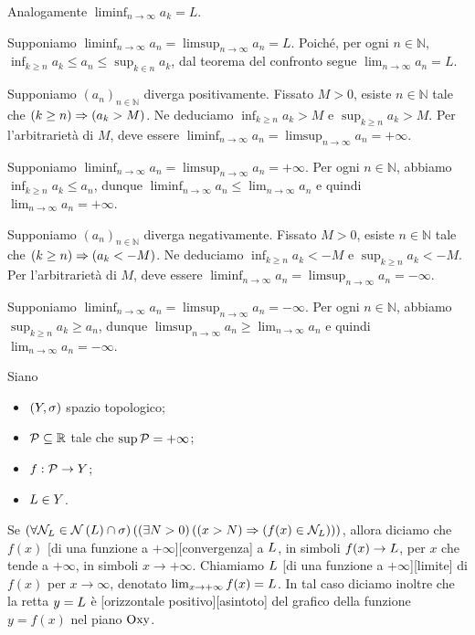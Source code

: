Analogamente
$\liminf_{n \rightarrow \infty} a_k = L$.
\par Supponiamo
$\liminf_{n \rightarrow \infty} a_n
  = \limsup_{n \rightarrow \infty} a_n = L$.
Poich\'e, per ogni $n \in \mathbb{N}$,
$\inf_{k \geq n} a_k \leq a_n \leq \sup_{k \in n} a_k$,
dal teorema del confronto segue
$\lim_{n \rightarrow \infty} a_n = L$.
\par Supponiamo $(a_n)_{n \in \mathbb{N}}$ diverga positivamente.
Fissato $M > 0$, esiste $n \in \mathbb{N}$ tale che
$\left ( k \geq n \right ) \Rightarrow \left ( a_k > M \right )$.
Ne deduciamo
$\inf_{k \geq n}  a_k > M$
e
$\sup_{k \geq n}  a_k > M$.
Per l'arbitrariet\`a di $M$, deve essere
$\liminf_{n \rightarrow \infty} a_n
  = \limsup_{n \rightarrow \infty} a_n = + \infty$.
\par Supponiamo
$\liminf_{n \rightarrow \infty} a_n
  = \limsup_{n \rightarrow \infty} a_n = + \infty$.
Per ogni $n \in \mathbb{N}$, abbiamo
$\inf_{k \geq n} a_k \leq a_n$, dunque
$\liminf_{n \rightarrow \infty} a_n \leq \lim_{n \rightarrow \infty} a_n$
e quindi
$\lim_{n \rightarrow \infty} a_n = + \infty$.
\par Supponiamo $(a_n)_{n \in \mathbb{N}}$ diverga negativamente.
Fissato $M > 0$, esiste $n \in \mathbb{N}$ tale che
$\left ( k \geq n \right ) \Rightarrow \left ( a_k < - M \right )$.
Ne deduciamo
$\inf_{k \geq n}  a_k < - M$
e
$\sup_{k \geq n}  a_k < - M$.
Per l'arbitrariet\`a di $M$, deve essere
$\liminf_{n \rightarrow \infty} a_n
  = \limsup_{n \rightarrow \infty} a_n = - \infty$.
\par Supponiamo
$\liminf_{n \rightarrow \infty} a_n
  = \limsup_{n \rightarrow \infty} a_n = - \infty$.
Per ogni $n \in \mathbb{N}$, abbiamo
$\sup_{k \geq n} a_k \geq a_n$, dunque
$\limsup_{n \rightarrow \infty} a_n \geq \lim_{n \rightarrow \infty} a_n$
e quindi
$\lim_{n \rightarrow \infty} a_n = - \infty$. \EndProof
\begin{Definition}
	Siano
	\begin{itemize}
		\item $(Y,\sigma)$ spazio topologico;
		\item $\mathcal{P} \subseteq \mathbb{R}$ tale che $\sup{\mathcal{P}} = + \infty$;
		\item $f: \mathcal{P} \rightarrow Y$;
		\item $L \in Y$.
	\end{itemize}
	Se $\ForAll{\Neighborhood_\Limit \in \Neighborhoods{\Limit} \cap \VarTopology}{\Exists{N > 0}{\Implies{x > N}{f(x) \in \Neighborhood_\Limit}}}$, allora diciamo che $f(x)$ [di una funzione a $+\infty$][convergenza] a $L$, in simboli $f(x) \rightarrow L$, per $x$ che tende a $+\infty$, in simboli $x \rightarrow +\infty$. Chiamiamo $L$ [di una funzione a $+\infty$][limite] di $f(x)$ per $x \rightarrow \infty$, denotato $\lim_{x \rightarrow +\infty} f(x) = L$. In tal caso diciamo inoltre che la retta $y = L$ \`e [orizzontale positivo][asintoto] del grafico della funzione $y = f(x)$ nel piano $\text{Oxy}$.
\end{Definition}
